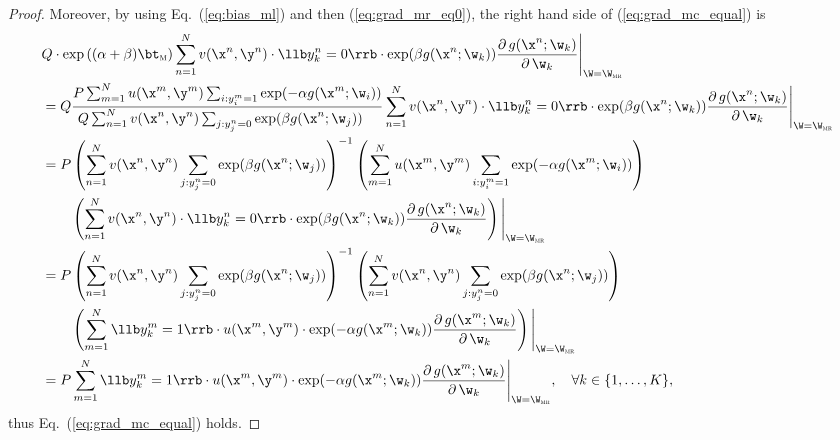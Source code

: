 \begin{proof}
Moreover, by using Eq.~(\ref{eq:bias_ml}) and then (\ref{eq:grad_mr_eq0}), the right hand side of (\ref{eq:grad_mc_equal}) is
\begin{equation*}
\begin{aligned}
&Q \cdot \exp \left( (\alpha + \beta) \bt_\textsc{m} \right)
   \sum_{n=1}^N v(\x^n, \y^n) \cdot \llb y_k^n = 0 \rrb \cdot \exp(\beta g(\x^n; \w_k)) 
   \frac{\partial \, g(\x^n; \w_k)}{\partial \, \w_k} \Bigg|_{\W = \W_\textsc{mr}} \\
&= Q 
   \frac{P \sum_{m=1}^N u(\x^m, \y^m) \sum_{i: y_i^m = 1} \exp(-\alpha g(\x^m; \w_i))}
        {Q \sum_{n=1}^N v(\x^n, \y^n) \sum_{j: y_j^n = 0} \exp( \beta  g(\x^n; \w_j)) \hspace{1em}} 
   \sum_{n=1}^N v(\x^n, \y^n) \cdot \llb y_k^n = 0 \rrb \cdot \exp( \beta  g(\x^n; \w_k)) 
   \frac{\partial \, g(\x^n; \w_k)}{\partial \, \w_k} \Bigg|_{\W = \W_\textsc{mr}} \\
&= P \left( \sum_{n=1}^N v(\x^n, \y^n) \sum_{j: y_j^n = 0} \exp( \beta  g(\x^n; \w_j)) \right)^{-1} 
     \left( \sum_{m=1}^N u(\x^m, \y^m) \sum_{i: y_i^m = 1} \exp(-\alpha g(\x^m; \w_i)) \right) \\
&    \hspace{2.1em}
     \left( \sum_{n=1}^N v(\x^n, \y^n) \cdot \llb y_k^n = 0 \rrb \cdot \exp( \beta  g(\x^n; \w_k)) 
     \frac{\partial \, g(\x^n; \w_k)}{\partial \, \w_k} \right) 
     \Bigg|_{\W = \W_\textsc{mr}} \\
&= P \left( \sum_{n=1}^N v(\x^n, \y^n) \sum_{j: y_j^n = 0} \exp( \beta  g(\x^n; \w_j)) \right)^{-1} 
     \left( \sum_{n=1}^N v(\x^n, \y^n) \sum_{j: y_j^n = 0} \exp( \beta  g(\x^n; \w_j)) \right) \\
&    \hspace{2.1em}
     \left( \sum_{m=1}^N \llb y_k^m=1 \rrb \cdot u(\x^m, \y^m) \cdot \exp(-\alpha g(\x^m; \w_k)) 
     \frac{\partial \, g(\x^m; \w_k)}{\partial \, \w_k} \right)
     \Bigg|_{\W = \W_\textsc{mr}} \\
&= P \sum_{m=1}^N \llb y_k^m=1 \rrb \cdot u(\x^m, \y^m) \cdot \exp(-\alpha g(\x^m; \w_k)) 
     \frac{\partial \, g(\x^m; \w_k)}{\partial \, \w_k} 
     \Bigg|_{\W = \W_\textsc{mr}}, \quad \forall k \in \{1,\dots,K\},
\end{aligned}
\end{equation*}
thus Eq.~(\ref{eq:grad_mc_equal}) holds.


\end{proof}
